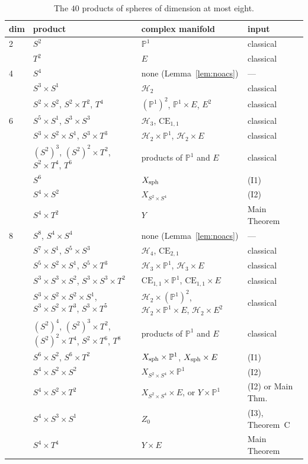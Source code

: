 \documentclass{article}
\theoremstyle{definition}
\theoremstyle{plain}
\newcommand{\PP}{\mathbb{P}}
\begin{document}
\begin{table}[ht]
\centering
\small
\renewcommand{\arraystretch}{1.08}
\begin{tabular}{@{}llll@{}}
\toprule
dim & product & complex manifold & input\\
\midrule
2 & $S^2$ & $\PP^1$ & classical\\
  & $T^2$ & $E$ & classical\\
\midrule
4 & $S^4$ & none (Lemma~\ref{lem:noacs}) & ---\\
  & $S^3\times S^1$ & $\mathcal H_2$ & classical\\
  & $S^2\times S^2$, $S^2\times T^2$, $T^4$ & $(\PP^1)^2$, $\PP^1\times E$, $E^2$ & classical\\
\midrule
6 & $S^5\times S^1$, $S^3\times S^3$ & $\mathcal H_3$, $\mathrm{CE}_{1,1}$ & classical\\
  & $S^3\times S^2\times S^1$, $S^3\times T^3$ & $\mathcal H_2\times\PP^1$, $\mathcal H_2\times E$ & classical\\
  & $(S^2)^3$, $(S^2)^2\times T^2$, $S^2\times T^4$, $T^6$ & products of $\PP^1$ and $E$ & classical\\
  & $S^6$ & $X_{\rm sph}$ & (I1)\\
  & $S^4\times S^2$ & $X_{S^2\times S^4}$ & (I2)\\
  & $S^4\times T^2$ & $Y$ & Main Theorem\\
\midrule
8 & $S^8$, $S^4\times S^4$ & none (Lemma~\ref{lem:noacs}) & ---\\
  & $S^7\times S^1$, $S^5\times S^3$ & $\mathcal H_4$, $\mathrm{CE}_{2,1}$ & classical\\
  & $S^5\times S^2\times S^1$, $S^5\times T^3$ & $\mathcal H_3\times\PP^1$, $\mathcal H_3\times E$ & classical\\
  & $S^3\times S^3\times S^2$, $S^3\times S^3\times T^2$ & $\mathrm{CE}_{1,1}\times\PP^1$, $\mathrm{CE}_{1,1}\times E$ & classical\\
  & $S^3\times S^2\times S^2\times S^1$, $S^3\times S^2\times T^3$, $S^3\times T^5$ & $\mathcal H_2\times(\PP^1)^2$, $\mathcal H_2\times\PP^1\times E$, $\mathcal H_2\times E^2$ & classical\\
  & $(S^2)^4$, $(S^2)^3\times T^2$, $(S^2)^2\times T^4$, $S^2\times T^6$, $T^8$ & products of $\PP^1$ and $E$ & classical\\
  & $S^6\times S^2$, $S^6\times T^2$ & $X_{\rm sph}\times\PP^1$, $X_{\rm sph}\times E$ & (I1)\\
  & $S^4\times S^2\times S^2$ & $X_{S^2\times S^4}\times\PP^1$ & (I2)\\
  & $S^4\times S^2\times T^2$ & $X_{S^2\times S^4}\times E$, or $Y\times\PP^1$ & (I2) or Main Thm.\\
  & $S^4\times S^3\times S^1$ & $Z_0$ & (I3), Theorem~C\\
  & $S^4\times T^4$ & $Y\times E$ & Main Theorem\\
\bottomrule
\end{tabular}
\medskip
\caption{The $40$ products of spheres of dimension at most eight.}\label{tab:spheres}
\end{table}
\end{document}
